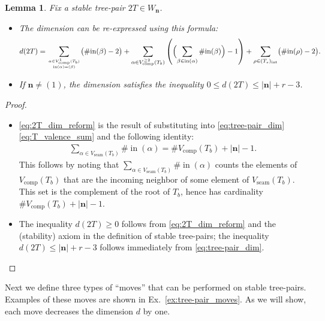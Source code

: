 \documentclass[11pt]{amsart}
\newtheorem{lemma}[theorem]{Lemma}
\theoremstyle{definition}
\theoremstyle{remark}
\theoremstyle{plain}
\newcommand\bn{\mathbf{n}}
\newcommand{\on}{\operatorname}
\newcommand{\comp}{C^2}
\renewcommand{\comp}{{\on{comp}}}
\newcommand{\seam}{{\on{seam}}}
\newcommand{\incom}{\on{in}}
\newcommand{\inte}{{\on{int}}}
\begin{document}
\begin{lemma}
\label{lem:Wn_dim}
Fix a stable tree-pair $2T \in W_\bn$.
\begin{itemize}
\item[(a)] The dimension can be re-expressed using this formula:
\begin{equation} \label{eq:2T_dim_reform}
	d(2T) = \sum_{{\alpha \in V^1_\comp(T_b)}\atop{\incom(\alpha) = (\beta)}} \bigl(\#\!\incom(\beta) - 2\bigr)
	+ \sum_{\alpha \in V^{\geq 2}_\comp(T_b)} \left(\Bigl(\sum_{\beta \in \incom(\alpha)} \#\!\incom(\beta)\Bigr)-1\right)
	+ \sum_{\rho \in (T_s)_\inte} \bigl(\#\!\incom(\rho) - 2\bigr).
\end{equation}

\item[(b)] If $\bn \neq (1)$, the dimension satisfies the inequality $0 \leq d(2T) \leq |\bn| + r - 3$.
\end{itemize}
\end{lemma}

\begin{proof}
\begin{itemize}
	\item[(a)] \eqref{eq:2T_dim_reform} is the result of substituting into \eqref{eq:tree-pair_dim} \eqref{eq:T_valence_sum} and the following identity:
	\begin{align}
	\label{eq:2T_valence_sum}
	\sum_{\alpha \in V_\seam(T_b)} \#\!\incom(\alpha) = \#\!V_\comp(T_b) + |\bn| - 1.
	\end{align}
	This follows by noting that $\sum_{\alpha \in V_\seam(T_b)} \#\!\incom(\alpha)$ counts the elements of $V_\comp(T_b)$ that are the incoming neighbor of some element of $V_\seam(T_b)$.
	This set is the complement of the root of $T_b$, hence has cardinality $\#\!V_\comp(T_b) + |\bn| - 1$.
	
	\item[(b)]
	The inequality $d(2T) \geq 0$ follows from \eqref{eq:2T_dim_reform} and the ({\sc stability}) axiom in the definition of stable tree-pairs; the inequality $d(2T) \leq |\bn| + r - 3$ follows immediately from \eqref{eq:tree-pair_dim}.
\end{itemize}
\end{proof}

Next we define three types of ``moves'' that can be performed on stable tree-pairs.
Examples of these moves are
shown in Ex.~\ref{ex:tree-pair_moves}.
As we will show, each move decreases the dimension $d$ by one.
\end{document}

